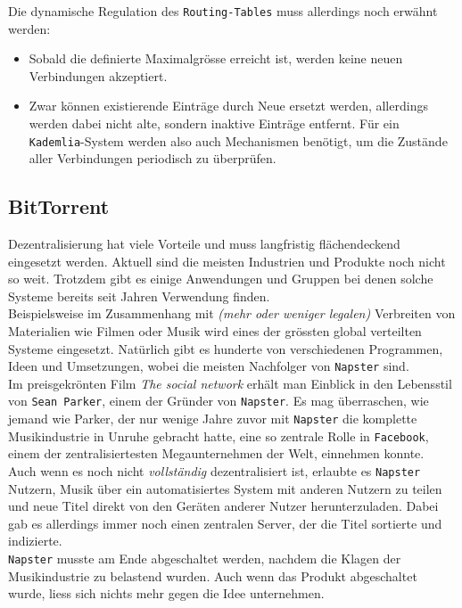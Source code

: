 \documentclass[a4paper,11pt,titlepage,twoside]{memoir}
\begin{document}
\begin{enumerate}
\noindent Die dynamische Regulation des \texttt{Routing-Tables} muss
allerdings noch erwähnt werden:
\begin{itemize}
\item Sobald die definierte Maximalgrösse erreicht ist, werden keine
neuen Verbindungen akzeptiert.
\item Zwar können existierende Einträge durch Neue ersetzt werden,
allerdings werden dabei nicht alte, sondern inaktive Einträge
entfernt. Für ein \texttt{Kademlia}-System werden also auch Mechanismen
benötigt, um die Zustände aller Verbindungen periodisch zu
überprüfen.
\end{itemize}
\end{enumerate}
\subsection{BitTorrent}
\label{sec:org0b0bdbd}
Dezentralisierung hat viele Vorteile und muss langfristig
flächendeckend eingesetzt werden. Aktuell sind die meisten
Industrien und Produkte noch nicht so weit. Trotzdem gibt es
einige Anwendungen und Gruppen bei denen solche Systeme bereits
seit Jahren Verwendung finden.\\

\noindent Beispielsweise im Zusammenhang mit \emph{(mehr oder weniger
legalen)} Verbreiten von Materialien wie Filmen oder Musik wird
eines der grössten global verteilten Systeme eingesetzt. Natürlich
gibt es hunderte von verschiedenen Programmen, Ideen und
Umsetzungen, wobei die meisten Nachfolger von \texttt{Napster} sind.\\

\noindent Im preisgekrönten Film \emph{The social network} erhält man
Einblick in den Lebensstil von \texttt{Sean Parker}, einem der Gründer von
\texttt{Napster}. Es mag überraschen, wie jemand wie Parker, der nur wenige
Jahre zuvor mit \texttt{Napster} die komplette Musikindustrie in Unruhe
gebracht hatte, eine so zentrale Rolle in \texttt{Facebook}, einem der
zentralisiertesten Megaunternehmen der Welt, einnehmen konnte.\\

\noindent Auch wenn es noch nicht \emph{vollständig} dezentralisiert ist,
erlaubte es \texttt{Napster} Nutzern, Musik über ein automatisiertes System
mit anderen Nutzern zu teilen und neue Titel direkt von den
Geräten anderer Nutzer herunterzuladen. Dabei gab es allerdings
immer noch einen zentralen Server, der die Titel sortierte und
indizierte. \\
\texttt{Napster} musste am Ende abgeschaltet werden, nachdem die Klagen der
Musikindustrie zu belastend wurden. Auch wenn das Produkt
abgeschaltet wurde, liess sich nichts mehr gegen die Idee
unternehmen.\\
\end{document}
